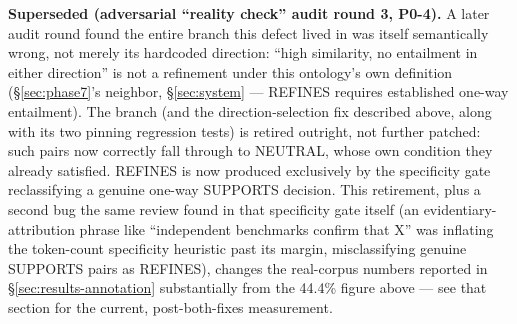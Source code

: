 \textbf{Superseded (adversarial ``reality check'' audit round 3, P0-4).} A
later audit round found the entire branch this defect lived in
was itself semantically wrong, not merely its hardcoded direction: ``high
similarity, no entailment in either direction'' is not a refinement under
this ontology's own definition (\S\ref{sec:phase7}'s neighbor,
\S\ref{sec:system} --- REFINES requires established one-way entailment).
The branch (and the direction-selection fix described above, along with
its two pinning regression tests) is retired outright, not further
patched: such pairs now correctly fall through to NEUTRAL, whose own
condition they already satisfied. REFINES is now produced exclusively by
the specificity gate reclassifying a genuine one-way SUPPORTS decision.
This retirement, plus a second bug the same review found in that
specificity gate itself (an evidentiary-attribution phrase like
``independent benchmarks confirm that X'' was inflating the token-count
specificity heuristic past its margin, misclassifying genuine SUPPORTS
pairs as REFINES), changes the real-corpus numbers reported in
\S\ref{sec:results-annotation} substantially from the 44.4\% figure
above --- see that section for the current, post-both-fixes measurement.
